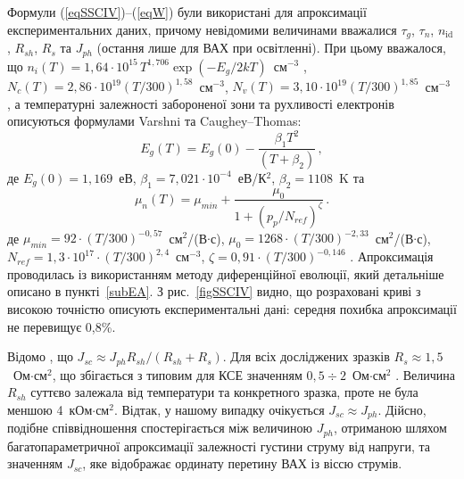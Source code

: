 Формули (\ref{eqSSCIV})--(\ref{eqW}) були використані для апроксимації експериментальних даних, причому
невідомими величинами вважалися $\tau_g$, $\tau_n$, $n_{\mathrm{id}}$, $R_{sh}$, $R_s$ та  $J_{ph}$ (остання лише для ВАХ при освітленні).
При цьому вважалося, що
$n_i(T)=1,64\cdot10^{15}\,T^{1,706}\exp(-E_g/2kT)$~см$^{-3}$ \cite{ni:Green}, $N_c(T)=2,86\cdot10^{19}(T/300)^{1,58}$~см$^{-3}$, $N_v(T)=3,10\cdot10^{19}(T/300)^{1,85}$~см$^{-3}$
\cite{Nc:Green},
а температурні залежності забороненої зони та рухливості електронів описуються формулами Varshni та Caughey--Thomas:
\begin{equation}
\label{eqEg}
 E_g(T) = E_g(0) - \frac{\beta_1 T^2}{(T + \beta_2)}\,,
\end{equation}
де
$E_g(0)=1,169$~еВ,
$\beta_1=7,021\cdot10^{-4}$~еВ/К$^2$,
$\beta_2=1108$~K \cite{Schroder2006,Markvart} та
\begin{equation}
\label{eqMu}
\mu_n(T) = \mu_{min}+\frac{\mu_0}{1+(p_p/N_{ref})^{\zeta}}\,.
\end{equation}
де
$\mu_{min}=92\cdot(T/300)^{-0,57}$~см$^2$/(В$\cdot$с),
$\mu_0=1268\cdot(T/300)^{-2,33}$~см$^2$/(В$\cdot$с),
$N_{ref}=1,3\cdot10^{17}\cdot(T/300)^{2,4}$~см$^{-3}$,
$\zeta=0,91\cdot(T/300)^{-0,146}$ \cite[с.~505, Table~A8.2]{Schroder2006}.
Апроксимація проводилась із використанням методу диференційної еволюції\cite{DE:Sun,DEWang,DEModif}, який детальніше описано в пункті~\ref{subEA}.
З рис.~\ref{figSSCIV} видно, що розраховані криві з високою точністю описують
експериментальні дані: середня похибка апроксимації не перевищує 0,8\%.

Відомо \cite{2Diod:Buhler}, що $J_{sc}\approx J_{ph}R_{sh}/(R_{sh}+R_{s})$.
Для всіх досліджених зразків $R_s\approx1,5$~Ом$\cdot$см$^2$,
що збігається з типовим для КСЕ значенням $0,5\div2$~Ом$\cdot$см$^2$ \cite{Breitenstein2013,SCRs:Mette}.
Величина $R_{sh}$ суттєво залежала від температури та конкретного зразка, проте не була меншою  4~кОм$\cdot$см$^2$.
Відтак, у нашому випадку очікується $J_{sc}\approx J_{ph}$.
 Дійсно, подібне співвідношення спостерігається між величиною $J_{ph}$, отриманою шляхом багатопараметричної апроксимації залежності густини струму від напруги, та значенням $J_{sc}$, яке відображає ординату перетину ВАХ із віссю струмів.

